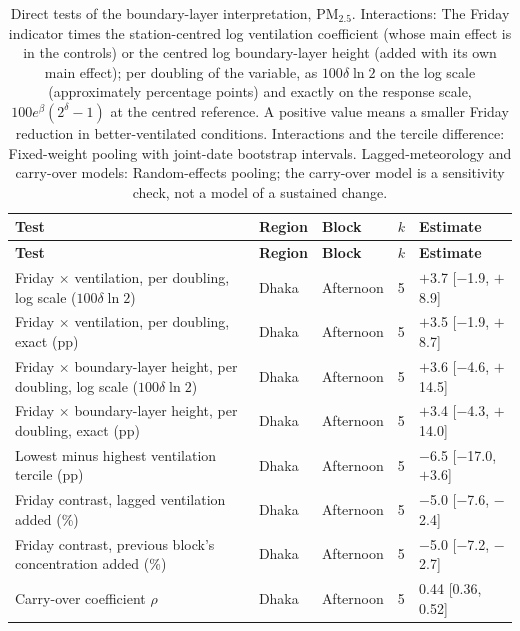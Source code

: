 \begingroup\footnotesize
\begin{longtable}{L{7.0cm} L{1.4cm} L{1.6cm} C{0.6cm} C{3.2cm}}
\caption{Direct tests of the boundary-layer interpretation, PM$_{2.5}$. Interactions: The Friday indicator times the station-centred log ventilation coefficient (whose main effect is in the controls) or the centred log boundary-layer height (added with its own main effect); per doubling of the variable, as $100\delta\ln 2$ on the log scale (approximately percentage points) and exactly on the response scale, $100e^{\beta}(2^{\delta}-1)$ at the centred reference. A positive value means a smaller Friday reduction in better-ventilated conditions. Interactions and the tercile difference: Fixed-weight pooling with joint-date bootstrap intervals. Lagged-meteorology and carry-over models: Random-effects pooling; the carry-over model is a sensitivity check, not a model of a sustained change.}\label{tab:s-mechanism}\\
\toprule
\textbf{Test} & \textbf{Region} & \textbf{Block} & \textbf{$k$} & \textbf{Estimate} \\
\midrule\endfirsthead
\toprule
\textbf{Test} & \textbf{Region} & \textbf{Block} & \textbf{$k$} & \textbf{Estimate} \\
\midrule\endhead
\bottomrule\endfoot
Friday $\times$ ventilation, per doubling, log scale ($100\delta\ln 2$) & Dhaka & Afternoon & 5 & $+$3.7 {\scriptsize[$-$1.9, $+$8.9]} \\
Friday $\times$ ventilation, per doubling, exact (pp) & Dhaka & Afternoon & 5 & $+$3.5 {\scriptsize[$-$1.9, $+$8.7]} \\
Friday $\times$ boundary-layer height, per doubling, log scale ($100\delta\ln 2$) & Dhaka & Afternoon & 5 & $+$3.6 {\scriptsize[$-$4.6, $+$14.5]} \\
Friday $\times$ boundary-layer height, per doubling, exact (pp) & Dhaka & Afternoon & 5 & $+$3.4 {\scriptsize[$-$4.3, $+$14.0]} \\
Lowest minus highest ventilation tercile (pp) & Dhaka & Afternoon & 5 & $-$6.5 {\scriptsize[$-$17.0, $+$3.6]} \\
Friday contrast, lagged ventilation added (\%) & Dhaka & Afternoon & 5 & $-$5.0 {\scriptsize[$-$7.6, $-$2.4]} \\
Friday contrast, previous block's concentration added (\%) & Dhaka & Afternoon & 5 & $-$5.0 {\scriptsize[$-$7.2, $-$2.7]} \\
Carry-over coefficient $\rho$ & Dhaka & Afternoon & 5 & 0.44 {\scriptsize[0.36, 0.52]} \\

\end{longtable}
